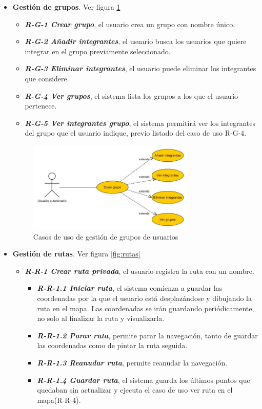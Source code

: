 \begin{itemize}
\item \textbf{Gestión de grupos}. Ver figura \ref{fig:grupo}
\begin{itemize}
\item\textbf{ \textit{R-G-1 Crear grupo}}, el usuario crea un grupo con nombre único.
\item\textbf{\textit{ R-G-2 Añadir integrantes}}, el usuario busca los usuarios que quiere integrar en el grupo previamente seleccionado.
\item \textbf{\textit{R-G-3 Eliminar integrantes}}, el usuario puede eliminar los integrantes que considere.
\item \textbf{\textit{R-G-4 Ver grupos}}, el sistema lista los grupos a los que el usuario pertenece.
\item \textbf{\textit{R-G-5 Ver integrantes grupo}}, el sistema permitirá ver los integrantes del grupo que el usuario indique, previo listado del caso de uso R-G-4. 

\end{itemize} 

\begin{figure}
		\centering
		\includegraphics[width=0.75\textwidth] {grupo.jpg}
		\caption{Casos de uso de gestión de grupos de usuarios }\label{fig:grupo}
	\end{figure}
	
	
	
\item \textbf{Gestión de rutas}. Ver figura \ref{fig:rutas} 
\begin{itemize}
\item \textbf{\textit{R-R-1 Crear ruta privada}}, el usuario registra la ruta con un nombre.
\begin{itemize}
\item \textbf{\textit{R-R-1.1 Iniciar ruta}}, el sistema comienza a guardar las coordenadas por la que el usuario está desplazándose y dibujando la ruta en el mapa. Las coordenadas se irán guardando periódicamente, no solo al finalizar la ruta y visualizarla.
\item\textbf{ \textit{R-R-1.2 Parar ruta}}, permite parar la navegación, tanto de guardar las coordenadas como de pintar la ruta seguida.
\item\textbf{ \textit{R-R-1.3 Reanudar ruta}}, permite reanudar la navegación.
\item \textbf{\textit{R-R-1.4 Guardar ruta}}, el sistema guarda los últimos puntos que quedaban sin actualizar y ejecuta el caso de uso ver ruta en el mapa(R-R-4).
\end{itemize}


\end{itemize}
\end{itemize}
